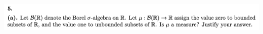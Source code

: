 







  \newpage
  \begin{mdframed}
    \includegraphics[width=400pt]{img/analysis--berkeley-202a-final-246a.png}
  \end{mdframed}

